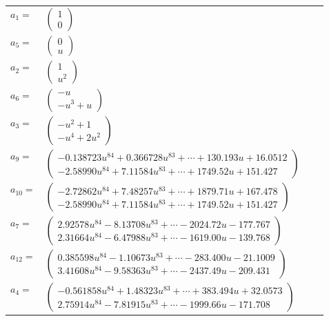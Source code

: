 \documentclass[1p]{elsarticle_modified}
\theoremstyle{definition}
\begin{document}
\begin{tabular}{m{7pt} m{180pt} m{7pt} m{180pt} }
\flushright $a_{1}=$&$\begin{pmatrix}1\\0\end{pmatrix}$ \\
\flushright $a_{5}=$&$\begin{pmatrix}0\\u\end{pmatrix}$ \\
\flushright $a_{2}=$&$\begin{pmatrix}1\\u^2\end{pmatrix}$ \\
\flushright $a_{6}=$&$\begin{pmatrix}- u\\- u^3+u\end{pmatrix}$ \\
\flushright $a_{3}=$&$\begin{pmatrix}- u^2+1\\- u^4+2 u^2\end{pmatrix}$ \\
\flushright $a_{9}=$&$\begin{pmatrix}-0.138723 u^{84}+0.366728 u^{83}+\cdots+130.193 u+16.0512\\-2.58990 u^{84}+7.11584 u^{83}+\cdots+1749.52 u+151.427\end{pmatrix}$ \\
\flushright $a_{10}=$&$\begin{pmatrix}-2.72862 u^{84}+7.48257 u^{83}+\cdots+1879.71 u+167.478\\-2.58990 u^{84}+7.11584 u^{83}+\cdots+1749.52 u+151.427\end{pmatrix}$ \\
\flushright $a_{7}=$&$\begin{pmatrix}2.92578 u^{84}-8.13708 u^{83}+\cdots-2024.72 u-177.767\\2.31664 u^{84}-6.47988 u^{83}+\cdots-1619.00 u-139.768\end{pmatrix}$ \\
\flushright $a_{12}=$&$\begin{pmatrix}0.385598 u^{84}-1.10673 u^{83}+\cdots-283.400 u-21.1009\\3.41608 u^{84}-9.58363 u^{83}+\cdots-2437.49 u-209.431\end{pmatrix}$ \\
\flushright $a_{4}=$&$\begin{pmatrix}-0.561858 u^{84}+1.48323 u^{83}+\cdots+383.494 u+32.0573\\2.75914 u^{84}-7.81915 u^{83}+\cdots-1999.66 u-171.708\end{pmatrix}$ \\

\end{tabular}
\end{document}

